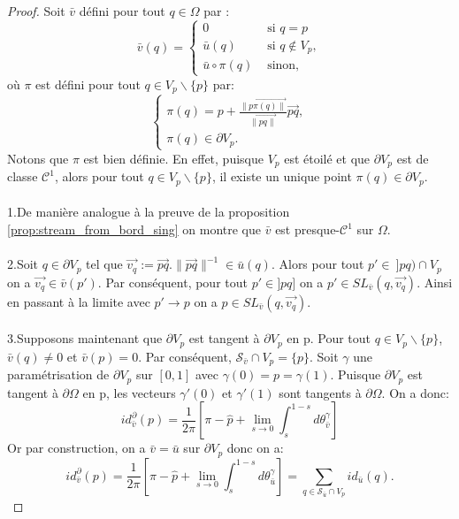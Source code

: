 \begin{proof}
Soit $\bar{v}$ défini pour tout $q\in\Omega$ par :
\begin{equation}
\bar{v}(q)=
\left\{
\begin{array}{ll}
0&\mbox{ si }q=p\\[0.25cm]
\bar{u}(q)&\mbox{ si } q\notin V_p,\\[0.25cm]
\bar{u}\circ\pi(q)&\mbox{ sinon},
\end{array}
\right.
\end{equation}
où $\pi$ est défini pour tout $q\in V_p\backslash\{p\}$ par:
\begin{equation*}
\left\{
\begin{array}{ll}
\pi(q)=p+\displaystyle\frac{\overrightarrow{\|p\pi(q)\|}}{\overrightarrow{\|pq\|}}\overrightarrow{pq},\\[0.5cm]
\pi(q)\in\partial V_p.
\end{array}
\right.
\end{equation*}
Notons que $\pi$ est bien définie. En effet, puisque $V_p$ est étoilé et que $\partial V_p$ est de classe $\mathcal{C}^1$, alors pour tout $q\in V_p\backslash\{p\}$, il existe un unique point $\pi(q)\in\partial V_p$.\\\\
1.\quad De manière analogue à la preuve de la proposition \ref{prop:stream_from_bord_sing} on montre que $\bar{v}$ est presque-$\mathcal{C}^1$ sur $\Omega$.\\\\
2.\quad Soit $q\in\partial V_p$ tel que $\overrightarrow{v_q}:=\overrightarrow{pq}.\|\overrightarrow{pq}\|^{-1} \in \bar{u}(q)$. Alors pour tout $p'\in~]pq)\cap V_p$ on a $\overrightarrow{v_q}\in\bar{v}(p')$. Par conséquent, pour tout $p'\in]pq]$ on a $p'\in SL_{\bar{v}}(q,\overrightarrow{v_q})$. Ainsi en passant à la limite avec $p'\longrightarrow p$ on a $p\in SL_{\bar{v}}(q,\overrightarrow{v_q})$.\\\\
3.\quad Supposons maintenant que $\partial V_p$ est tangent à $\partial V_p$ en p. Pour tout $q\in V_p\backslash\{p\}$, $\bar{v}(q)\neq 0$ et $\bar{v}(p)=0$. Par conséquent, $\mathcal{S}_{\bar{v}}\cap V_p=\{p\}$. Soit $\gamma$ une paramétrisation de $\partial V_p$ sur $[0, 1]$ avec $\gamma(0)=p=\gamma(1)$. Puisque $\partial V_p$ est tangent à $\partial\Omega$ en p, les vecteurs $\gamma'(0)$ et $\gamma'(1)$ sont tangents à $\partial\Omega$. On a donc:
$$
id^\partial_{\bar{v}}(p)=\frac{1}{2\pi}\left[\pi-\hat{p}+\lim\limits_{s\rightarrow 0}\int_s^{1-s}d\theta_{\bar{v}}^\gamma\right]
$$
Or par construction, on a $\bar{v}=\bar{u}$ sur $\partial V_p$ donc on a:
$$id^\partial_{\bar{v}}(p)=\frac{1}{2\pi}\left[\pi-\hat{p}+\lim\limits_{s\rightarrow 0}\int_s^{1-s}d\theta_{\bar{u}}^\gamma\right]=\sum_{q\in\mathcal{S}_{\bar{u}}\cap V_p}id_{\bar{u}}(q).$$

\end{proof}


